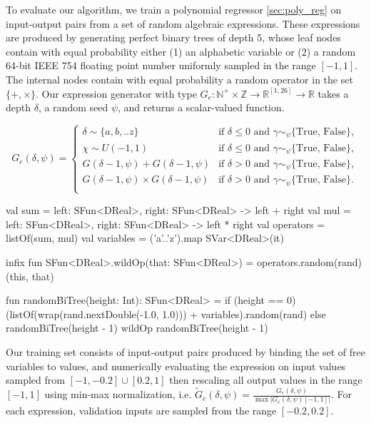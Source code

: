 To evaluate our algorithm, we train a polynomial regressor \autoref{sec:poly_reg} on input-output pairs from a set of random algebraic expressions. These expressions are produced by generating perfect binary trees of depth 5, whose leaf nodes contain with equal probability either (1) an alphabetic variable or (2) a random 64-bit IEEE 754 floating point number uniformly sampled in the range $[-1, 1]$. The internal nodes contain with equal probability a random operator in the set $\{+, \times\}$. Our expression generator with type $G_e: \mathbb{N}^+\times\mathbb{Z} \rightarrow \mathbb{R}^{[1, 26]} \rightarrow \mathbb{R}$ takes a depth $\delta$, a random seed $\psi$, and returns a scalar-valued function.

\begin{equation}\label{eq:btree_gen}
G_e(\delta, \psi) = \begin{cases}
\delta\sim\{a,b,..z\} & \text{if } \delta \leq 0 \text{ and } \gamma\sim_\psi\{\text{True, False}\},\\
\chi\sim U(-1, 1) & \text{if } \delta \leq 0 \text{ and } \gamma\sim_\psi\{\text{True, False}\},\\
G(\delta-1, \psi) + G(\delta-1, \psi) & \text{if } \delta > 0 \text{ and } \gamma\sim_\psi\{\text{True, False}\},\\
G(\delta-1, \psi) \times G(\delta-1, \psi) & \text{if } \delta > 0 \text{ and } \gamma\sim_\psi\{\text{True, False}\}.\\
\end{cases}
\end{equation}

\begin{kotlinlisting}
val sum = { left: SFun<DReal>, right: SFun<DReal> -> left + right }
val mul = { left: SFun<DReal>, right: SFun<DReal> -> left * right }
val operators = listOf(sum, mul)
val variables = ('a'..'z').map { SVar<DReal>(it) }

infix fun SFun<DReal>.wildOp(that: SFun<DReal>) = operators.random(rand)(this, that)

fun randomBiTree(height: Int): SFun<DReal> =
  if (height == 0) (listOf(wrap(rand.nextDouble(-1.0, 1.0))) + variables).random(rand)
  else randomBiTree(height - 1) wildOp randomBiTree(height - 1)
\end{kotlinlisting}

Our training set consists of input-output pairs produced by binding the set of free variables to values, and numerically evaluating the expression on input values sampled from $[-1, -0.2] \cup [0.2, 1]$ then rescaling all output values in the range $[-1, 1]$ using min-max normalization, i.e. $\tilde{G}_e(\delta, \psi)= \frac{G_e(\delta, \psi)}{\max |G_e(\delta, \psi)[-1, 1]|}$. For each expression, validation inputs are sampled from the range $[-0.2, 0.2]$.

